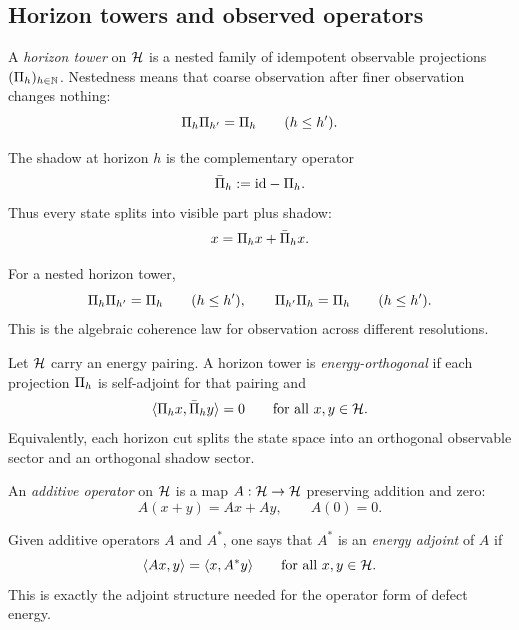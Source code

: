 \subsection{Horizon towers and observed operators}

\begin{definition}
\label{def:horizon-tower}
A \emph{horizon tower} on $\mathcal{H}$ is a nested family of idempotent observable
projections $(\Pi_{h})_{h\in\mathbb{N}}$.
Nestedness means that coarse observation after finer observation changes
nothing:
\[
\Pi_{h}\Pi_{h'}=\Pi_{h}
\qquad (h\le h').
\]
\end{definition}

\begin{definition}\label{def:shadow-projector}
The shadow at horizon $h$ is the complementary operator
\[
\bar{\Pi}_{h}:=\mathrm{id}-\Pi_{h}.
\]
Thus every state splits into visible part plus shadow:
\[
x=\Pi_{h}x+\bar{\Pi}_{h}x.
\]
\end{definition}

\begin{definition}\label{def:transitivity}
For a nested horizon tower,
\[
\Pi_{h}\Pi_{h'}=\Pi_{h}
\qquad (h\le h'),
\qquad
\Pi_{h'}\Pi_{h}=\Pi_{h}
\qquad (h\le h').
\]
This is the algebraic coherence law for observation across different
resolutions.
\end{definition}

\begin{definition}\label{def:orthogonal-tower}
Let $\mathcal{H}$ carry an energy pairing. A horizon tower is
\emph{energy-orthogonal} if each projection $\Pi_{h}$ is self-adjoint for that
pairing and
\[
\langle \Pi_{h}x,\bar{\Pi}_{h}y\rangle = 0
\qquad
\text{for all }x,y\in\mathcal{H}.
\]
Equivalently, each horizon cut splits the state space into an orthogonal
observable sector and an orthogonal shadow sector.
\end{definition}

\begin{definition}\label{def:linear-operator}
An \emph{additive operator} on $\mathcal{H}$ is a map $A:\mathcal{H}\to\mathcal{H}$ preserving addition
and zero:
\[
A(x+y)=Ax+Ay,
\qquad
A(0)=0.
\]
\end{definition}

\begin{definition}\label{def:adjoint}
Given additive operators $A$ and $A^\ast$, one says that $A^\ast$ is an
\emph{energy adjoint} of $A$ if
\[
\langle Ax,y\rangle = \langle x,A^\ast y\rangle
\qquad
\text{for all }x,y\in\mathcal{H}.
\]
This is exactly the adjoint structure needed for the operator form of defect
energy.
\end{definition}

